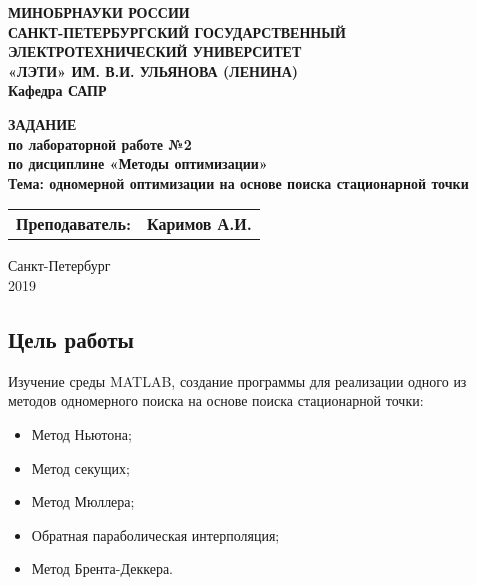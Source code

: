 \documentclass[a4paper,12pt]{article}
\begin{document}
\thispagestyle{empty} %

\begin{centering}
	\textbf{
{\large МИНОБРНАУКИ РОССИИ\\
САНКТ-ПЕТЕРБУРГСКИЙ ГОСУДАРСТВЕННЫЙ\\
ЭЛЕКТРОТЕХНИЧЕСКИЙ УНИВЕРСИТЕТ\\
«ЛЭТИ» ИМ. В.И. УЛЬЯНОВА (ЛЕНИНА)\\
Кафедра САПР}\\
}
\end{centering}


\vspace{7cm}

\begin{centering}
\textbf{ {\large 
ЗАДАНИЕ\\
по лабораторной работе №2\\
по дисциплине «Методы оптимизации»\\
Тема:  одномерной оптимизации на основе поиска
стационарной точки\guillemotright\\
}}
\end{centering}

\vspace{4cm}

\begin{tabular}{l r}
\textbf{ {\large Преподаватель:}}&\hspace{6cm} \textbf{ {\large Каримов А.И.}}\\
\end{tabular}

\vspace{7cm}


\begin{centering}
	{\large
Санкт-Петербург \\
2019 \\
}
\end{centering}

\newpage
 
\subsection*{Цель работы}

Изучение среды MATLAB, создание программы для реализации одного из методов одномерного поиска на основе поиска стационарной точки: 

\begin{itemize}
	\item Метод Ньютона;
	\item Метод секущих;
	\item Метод Мюллера;
	\item Обратная параболическая интерполяция;
	\item Метод Брента-Деккера.
\end{itemize}
\end{document}
